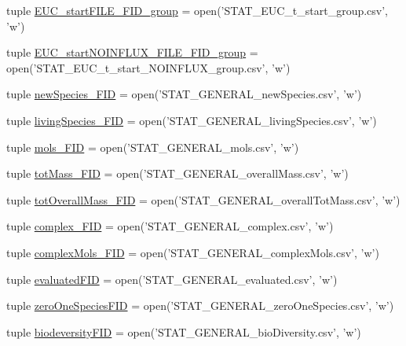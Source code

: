 \begin{DoxyCompactItemize}
\item 
tuple \hyperlink{a00130_abe1a2acadc97e46d55c6f4164c0890dc}{E\-U\-C\-\_\-start\-F\-I\-L\-E\-\_\-\-F\-I\-D\-\_\-group} = open('S\-T\-A\-T\-\_\-\-E\-U\-C\-\_\-t\-\_\-start\-\_\-group.\-csv', 'w')
\item 
tuple \hyperlink{a00130_aef08a333d5fed02e90483cc87e389ed0}{E\-U\-C\-\_\-start\-N\-O\-I\-N\-F\-L\-U\-X\-\_\-\-F\-I\-L\-E\-\_\-\-F\-I\-D\-\_\-group} = open('S\-T\-A\-T\-\_\-\-E\-U\-C\-\_\-t\-\_\-start\-\_\-\-N\-O\-I\-N\-F\-L\-U\-X\-\_\-group.\-csv', 'w')
\item 
tuple \hyperlink{a00130_abdb6e583333cc08cac8c63631db80b5b}{new\-Species\-\_\-\-F\-I\-D} = open('S\-T\-A\-T\-\_\-\-G\-E\-N\-E\-R\-A\-L\-\_\-new\-Species.\-csv', 'w')
\item 
tuple \hyperlink{a00130_ab7bbe9440116d34c9a373c40fc59bb3d}{living\-Species\-\_\-\-F\-I\-D} = open('S\-T\-A\-T\-\_\-\-G\-E\-N\-E\-R\-A\-L\-\_\-living\-Species.\-csv', 'w')
\item 
tuple \hyperlink{a00130_a603a41889d8732146d44da83ffaf0489}{mols\-\_\-\-F\-I\-D} = open('S\-T\-A\-T\-\_\-\-G\-E\-N\-E\-R\-A\-L\-\_\-mols.\-csv', 'w')
\item 
tuple \hyperlink{a00130_a1b7f5672822b59c7284cd2b703aacbc2}{tot\-Mass\-\_\-\-F\-I\-D} = open('S\-T\-A\-T\-\_\-\-G\-E\-N\-E\-R\-A\-L\-\_\-overall\-Mass.\-csv', 'w')
\item 
tuple \hyperlink{a00130_a20a06acdb6e82bcaab87d2781d3555a9}{tot\-Overall\-Mass\-\_\-\-F\-I\-D} = open('S\-T\-A\-T\-\_\-\-G\-E\-N\-E\-R\-A\-L\-\_\-overall\-Tot\-Mass.\-csv', 'w')
\item 
tuple \hyperlink{a00130_ace41560d233dff88c3073be734bae944}{complex\-\_\-\-F\-I\-D} = open('S\-T\-A\-T\-\_\-\-G\-E\-N\-E\-R\-A\-L\-\_\-complex.\-csv', 'w')
\item 
tuple \hyperlink{a00130_a2ef28958c50aabe7867b32f8dd6f4ace}{complex\-Mols\-\_\-\-F\-I\-D} = open('S\-T\-A\-T\-\_\-\-G\-E\-N\-E\-R\-A\-L\-\_\-complex\-Mols.\-csv', 'w')
\item 
tuple \hyperlink{a00130_a2cc9b964c81489c25978be53ab38eb16}{evaluated\-F\-I\-D} = open('S\-T\-A\-T\-\_\-\-G\-E\-N\-E\-R\-A\-L\-\_\-evaluated.\-csv', 'w')
\item 
tuple \hyperlink{a00130_a3dc90aca8a97c5995b013887c98d8ce9}{zero\-One\-Species\-F\-I\-D} = open('S\-T\-A\-T\-\_\-\-G\-E\-N\-E\-R\-A\-L\-\_\-zero\-One\-Species.\-csv', 'w')
\item 
tuple \hyperlink{a00130_a68c23cb79e89d9e14acf9ed09f46f0e4}{biodeversity\-F\-I\-D} = open('S\-T\-A\-T\-\_\-\-G\-E\-N\-E\-R\-A\-L\-\_\-bio\-Diversity.\-csv', 'w')

\end{DoxyCompactItemize}
